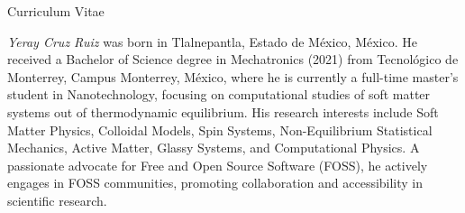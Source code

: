 \huge{Curriculum Vitae} \\
\normalsize
\vspace*{1.0 cm}


\emph{Yeray Cruz Ruiz} was born in Tlalnepantla, Estado de México, México. He received a Bachelor of Science degree in Mechatronics (2021) from Tecnológico de Monterrey, Campus Monterrey, México, where he is currently a full-time master's student in Nanotechnology, focusing on computational studies of soft matter systems out of thermodynamic equilibrium. His research interests include Soft Matter Physics, Colloidal Models, Spin Systems, Non-Equilibrium Statistical Mechanics, Active Matter, Glassy Systems, and Computational Physics. A passionate advocate for Free and Open Source Software (FOSS), he actively engages in FOSS communities, promoting collaboration and accessibility in scientific research.

